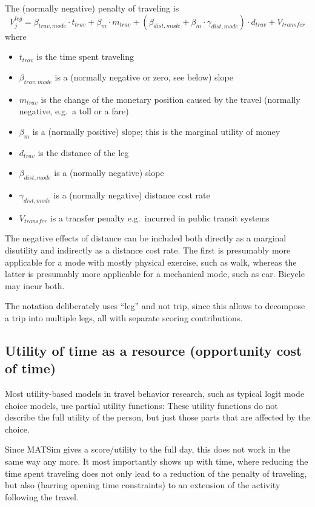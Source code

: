 The (normally negative) penalty of traveling is
\[
V^{leg}_j = \beta_{trav,mode} \cdot t_{trav} 
%
+ \beta_m \cdot m_{trav}
%
+ (\beta_{dist,mode} + \beta_m \cdot \gamma_{dist,mode}) \cdot d_{trav}
%
+ V_{transfer}
\]
where
\begin{itemize}
\item $t_{trav}$ is the time spent traveling
\item $\beta_{trav,mode}$ is a (normally negative or zero, see below) slope
\item $m_{trav}$ is the change of the monetary position caused by the travel (normally negative, e.g.\ a toll or a fare)
\item $\beta_m$ is a (normally positive) slope; this is the marginal utility of money
\item $d_{trav}$ is the distance of the leg
\item $\beta_{dist,mode}$ is a (normally negative) slope
\item $\gamma_{dist,mode}$ is a (normally negative) distance cost rate
\item $V_{transfer}$ is a transfer penalty e.g.\ incurred in public transit systems
\end{itemize}
The negative effects of distance can be included both directly as a marginal disutility and indirectly as a distance cost rate.  The first is presumably more applicable for a mode with mostly physical exercise, such as walk, whereas the latter is presumably more applicable for a mechanical mode, such as car.  Bicycle may incur both.

The notation deliberately uses ``leg'' and not trip, since this allows to decompose a trip into multiple legs, all with separate scoring contributions.

\subsection{Utility of time as a resource (opportunity cost of time)}

Most utility-based models in travel behavior research, such as typical logit mode choice models, use partial utility functions: These utility functions do not describe the full utility of the person, but just those parts that are affected by the choice.

Since MATSim gives a score/utility to the full day, this does not work in the same way any more.  It most importantly shows up with time, where reducing the time spent traveling does not only lead to a reduction of the penalty of traveling, but also (barring opening time constraints) to an extension of the activity following the travel.

